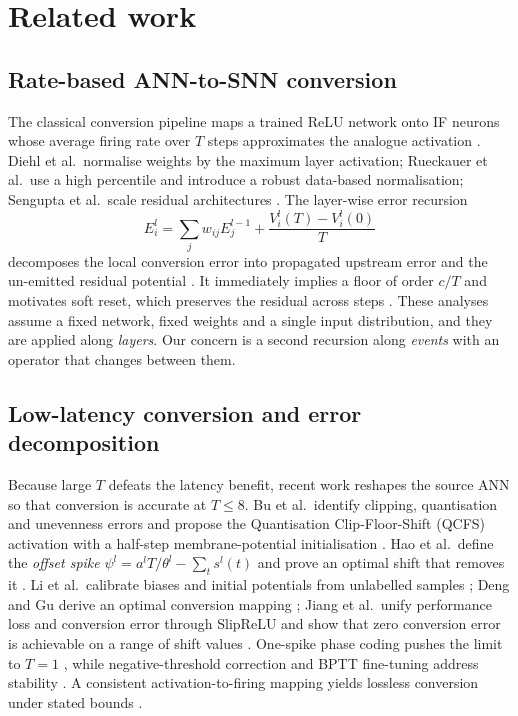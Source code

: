 \documentclass[preprint,12pt]{elsarticle}
\begin{document}
\section{Related work}
\label{sec:related}

\subsection{Rate-based ANN-to-SNN conversion}

The classical conversion pipeline maps a trained ReLU network onto IF neurons whose average firing rate over $T$ steps approximates the analogue activation \cite{cao2015spiking,diehl2015,rueckauer2017}. Diehl et al.\ normalise weights by the maximum layer activation; Rueckauer et al.\ use a high percentile and introduce a robust data-based normalisation; Sengupta et al.\ scale residual architectures \cite{sengupta2019going}. The layer-wise error recursion
\begin{equation}
E_i^{l}=\sum_j w_{ij}E_j^{l-1}+\frac{V_i^{l}(T)-V_i^{l}(0)}{T}
\label{eq:layer}
\end{equation}
decomposes the local conversion error into propagated upstream error and the un-emitted residual potential \cite{habara2024}. It immediately implies a floor of order $c/T$ and motivates soft reset, which preserves the residual across steps \cite{han2020rmp}. These analyses assume a fixed network, fixed weights and a single input distribution, and they are applied along \emph{layers}. Our concern is a second recursion along \emph{events} with an operator that changes between them.

\subsection{Low-latency conversion and error decomposition}

Because large $T$ defeats the latency benefit, recent work reshapes the source ANN so that conversion is accurate at $T\le 8$. Bu et al.\ identify clipping, quantisation and unevenness errors and propose the Quantisation Clip-Floor-Shift (QCFS) activation with a half-step membrane-potential initialisation \cite{bu2022qcfs}. Hao et al.\ define the \emph{offset spike} $\psi^{l}=a^{l}T/\theta^{l}-\sum_t s^{l}(t)$ and prove an optimal shift that removes it \cite{cos2023offset}. Li et al.\ calibrate biases and initial potentials from unlabelled samples \cite{li2021freelunch,li2022snncap}; Deng and Gu derive an optimal conversion mapping \cite{deng2021optimal}; Jiang et al.\ unify performance loss and conversion error through SlipReLU and show that zero conversion error is achievable on a range of shift values \cite{jiang2024universal}. One-spike phase coding pushes the limit to $T{=}1$ \cite{li2024onespike}, while negative-threshold correction and BPTT fine-tuning address stability \cite{xia2026neuro}. A consistent activation-to-firing mapping yields lossless conversion under stated bounds \cite{li2024casc}.
\end{document}
